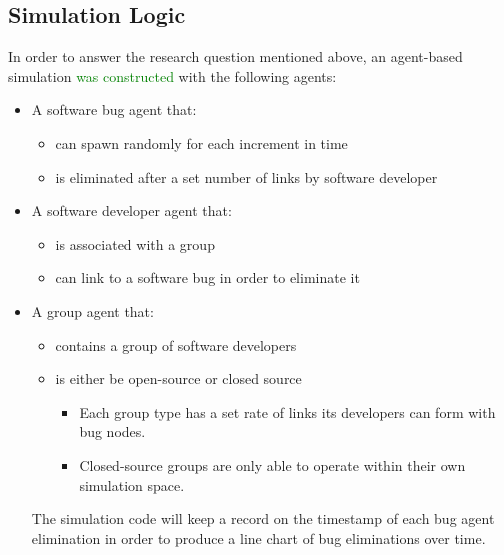 \documentclass[10pt, a4paper, fleqn]{article}
\begin{document}
\subsection{Simulation Logic}
In order to answer the research question mentioned above, an agent-based simulation \textcolor{green}{was constructed} with the following agents:
\begin{itemize}
	\item A software bug agent that:
	\begin{itemize}
		\item can spawn randomly for each increment in time
		\item is eliminated after a set number of links by software developer
	\end{itemize}
	\item A software developer agent that:
	\begin{itemize}
		\item is associated with a group
		\item can link to a software bug in order to eliminate it
	\end{itemize}
	\item A group agent that:
	\begin{itemize}
		\item contains a group of software developers
		\item is either be open-source or closed source
		\begin{itemize}
			\item Each group type has a set rate of links its developers can form with bug nodes.
			\item Closed-source groups are only able to operate within their own simulation space.
		\end{itemize}
	\end{itemize}
	The simulation code will keep a record on the timestamp of each bug agent elimination in order to produce a line chart of bug eliminations over time.
\end{itemize}
\end{document}
